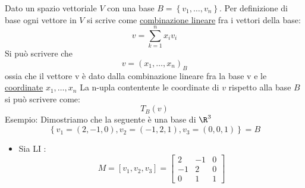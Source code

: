 \documentclass[12pt,a4paper,oneside]{article}
\begin{document}
Dato un spazio vettoriale $V$ con una base $B=\left\{ v_1,\ldots,v_n \right\} $. Per definizione di base ogni vettore in $V$ si scrive come \underline{combinazione lineare} fra i vettori della base:
\[
	v= \sum_{k=1}^{n} x_iv_i
\]
Si può scrivere che
\[
	v = \left( x_1,\ldots,x_n \right) _B
\]
ossia che il vettore v è dato dalla combinazione lineare fra la base v e  le \underline{coordinate} $x_1,\ldots,x_n$
\vskip3mm
La n-upla contentente le coordinate di $v$ rispetto alla base $B$ si può scrivere come:
\[
	T_B\left( v \right)
\]
\hr
Esempio:
Dimostriamo che la seguente è una base di $\R^{3}$
\[
	\left\{ v_1 = \left( 2,-1,0 \right) , v_2 = \left( -1,2,1 \right) , v_3=\left( 0,0,1 \right)  \right\} = B
\]
\begin{itemize}
	\item Sia LI :
	      \[
		      M = \left[ v_1,v_2,v_3 \right] =
		      \begin{bmatrix}
			      2  & -1 & 0 \\
			      -1 & 2  & 0 \\
			      0  & 1  & 1
		      \end{bmatrix}
	      \]
\end{itemize}
\end{document}
